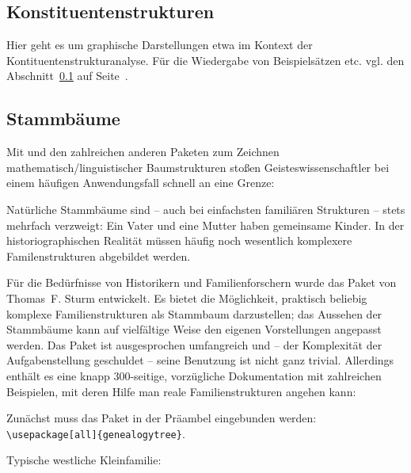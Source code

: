 \subsection{Konstituentenstrukturen}
\label{linguistische-strukturen}
   
 


Hier geht es um graphische Darstellungen etwa im Kontext der Kontituentenstrukturanalyse.
Für die Wiedergabe von Beispielsätzen etc. vgl. den
Abschnitt~\ref{linguistische-strukturen} auf Seite~\pageref{linguistische-strukturen
}.






\subsection{Stammbäume}
 

Mit  und den zahlreichen anderen Paketen zum Zeichnen mathematisch/linguistischer
Baumstrukturen stoßen Geisteswissenschaftler bei einem häufigen Anwendungsfall schnell an eine
Grenze:

Natürliche Stammbäume sind -- auch bei einfachsten familiären Strukturen -- stets mehrfach
verzweigt: Ein Vater und eine Mutter haben gemeinsame Kinder. 
In der historiographischen Realität müssen häufig noch wesentlich komplexere Familenstrukturen
abgebildet werden.

Für die Bedürfnisse von Historikern und Familienforschern wurde das Paket 
von Thomas~F. Sturm entwickelt.
Es bietet die Möglichkeit, praktisch beliebig komplexe Familienstrukturen als Stammbaum darzustellen;
das Aussehen der Stammbäume kann auf vielfältige Weise den eigenen Vorstellungen angepasst werden.
Das Paket ist ausgesprochen umfangreich und -- der Komplexität der Aufgabenstellung geschuldet --
seine Benutzung ist nicht ganz trivial.
Allerdings enthält es eine knapp 300-seitige, vorzügliche Dokumentation mit zahlreichen Beispielen,
mit deren Hilfe man reale Familienstrukturen  angehen kann:

Zunächst muss das Paket in der Präambel eingebunden werden:
\lstinline/\usepackage[all]{genealogytree}/.

Typische westliche Kleinfamilie:

\begin{lfgwexample}{}
\end{lfgwexample}



